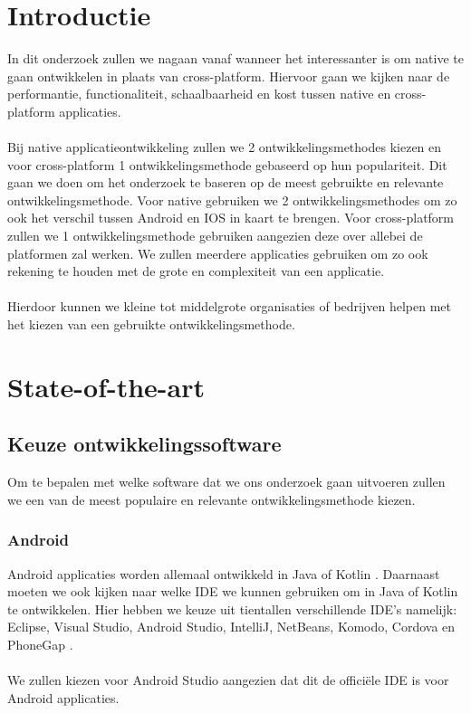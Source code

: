
\section{Introductie}%
\label{sec:introductie}

In dit onderzoek zullen we nagaan vanaf wanneer het interessanter is om native te gaan ontwikkelen in 
plaats van cross-platform. Hiervoor gaan we kijken naar de performantie, functionaliteit, schaalbaarheid 
en kost tussen native en cross-platform applicaties.
\\\\
Bij native applicatieontwikkeling zullen we 2 ontwikkelingsmethodes kiezen en voor cross-platform 
1 ontwikkelingsmethode gebaseerd op hun populariteit. Dit gaan we doen om het onderzoek te baseren 
op de meest gebruikte en relevante ontwikkelingsmethode. Voor native gebruiken we 2 
ontwikkelingsmethodes om zo ook het verschil tussen Android en IOS in kaart te brengen. 
Voor cross-platform zullen we 1 ontwikkelingsmethode gebruiken aangezien deze over allebei 
de platformen zal werken. We zullen meerdere applicaties gebruiken om zo ook rekening te houden 
met de grote en complexiteit van een applicatie.
\\\\
Hierdoor kunnen we kleine tot middelgrote organisaties of bedrijven helpen met het kiezen van 
een gebruikte ontwikkelingsmethode.


\section{State-of-the-art}%
\label{sec:state-of-the-art}

\subsection{Keuze ontwikkelingssoftware}
Om te bepalen met welke software dat we ons onderzoek gaan uitvoeren zullen we een van de 
meest populaire en relevante ontwikkelingsmethode kiezen. 
\subsubsection{Android}
Android applicaties worden allemaal ontwikkeld in Java of Kotlin \autocite{Faisal2021}. 
Daarnaast moeten we ook kijken naar welke IDE we kunnen gebruiken om in Java of Kotlin te 
ontwikkelen. Hier hebben we keuze uit tientallen verschillende IDE's namelijk: Eclipse, 
Visual Studio, Android Studio, IntelliJ, NetBeans, Komodo, Cordova en PhoneGap \autocite{Harvey2021}. 
\\\\
We zullen kiezen voor Android Studio aangezien dat dit de officiële IDE is voor Android 
applicaties. \autocite{JavaTpoint2019}
